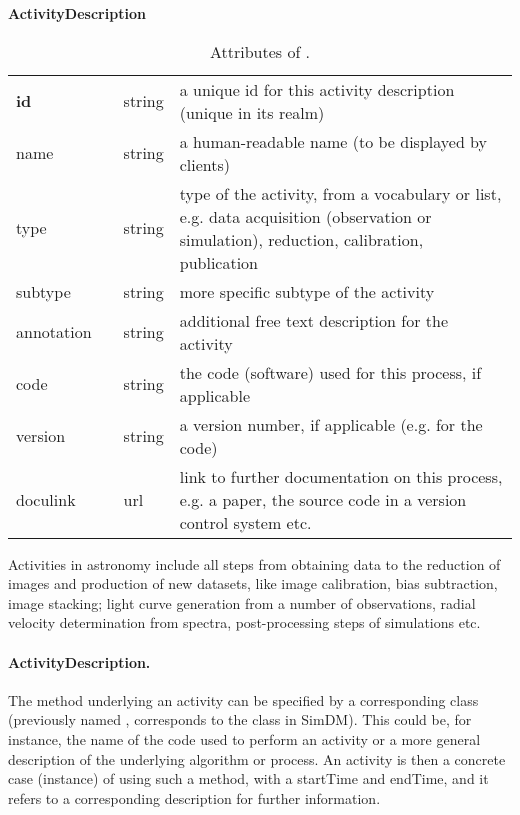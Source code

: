 \begin{table}[ht]
\small
{}\textwidth
\textbf{\normalsize ActivityDescription}\vspace{0.25em}\\
\begin{tabulary}{1.0\textwidth}{@{}p{2.5cm}p{0cm}lL@{}}
\toprule
{} & \head{} &  & \\
\midrule
\textbf{id}  & & string & a unique id for this activity description (unique in its realm)\\
name         & & string & a human-readable name (to be displayed by clients)\\
type         & & string & type of the activity, from a vocabulary or list, e.g. data acquisition (observation or simulation), reduction, calibration, publication\\
subtype      & & string & more specific subtype of the activity\\
annotation  & & string & additional free text description for the activity\\
code         & & string & the code (software) used for this process, if applicable\\
version      & & string & a version number, if applicable (e.g. for the code)\\
doculink     & & url    & link to further documentation on this process, e.g. a 
paper, the source code in a version control system etc.\\
\bottomrule
\end{tabulary}
\caption[Attributes of ]{Attributes of .}
\end{table}


Activities in astronomy include all steps from obtaining data to the reduction of 
images and production of new datasets, like image calibration, bias subtraction, image stacking; 
light curve generation from a number of observations, radial velocity 
determination from spectra, post-processing steps of simulations etc.

\paragraph{ActivityDescription.}
The method underlying an activity can be specified by a corresponding 
 class (previously named , corresponds 
to the  class in SimDM). This could be, 
for instance, the name of the code used to perform an activity or a more general 
description of the underlying algorithm or process. An activity is then a 
concrete case (instance) of using such a method, with a startTime and endTime, 
and it refers to a corresponding description for further information.

